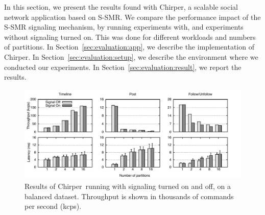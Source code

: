 \documentclass[11pt]{article}
\newcommand{\ssmr}{\mbox{S-SMR}}
\newcommand{\appname}{Chirper} %
\begin{document}
In this section, we present the results found with \appname{}, a scalable social network application based on \ssmr{}.
We compare the performance impact of the \ssmr{} signaling mechanism, by running experiments with, and experiments without signaling turned on.
This was done for different workloads and numbers of partitions.
In Section~\ref{sec:evaluation:app}, we describe the implementation of \appname{}.
In Section~\ref{sec:evaluation:setup}, we describe the environment where we conducted our experiments.
In Section~\ref{sec:evaluation:result}, we report the results.

\begin{figure}
\begin{minipage}[b]{1\linewidth} %
\centering
      \includegraphics[width=1\linewidth]{figures/sc-at-scale-balance}
%
\end{minipage}
\caption{Results of \appname\ running with signaling turned on and off, on a balanced dataset. Throughput is shown in thousands of commands per second (kcps).}
\label{fig:perf}
\end{figure}
\end{document}
